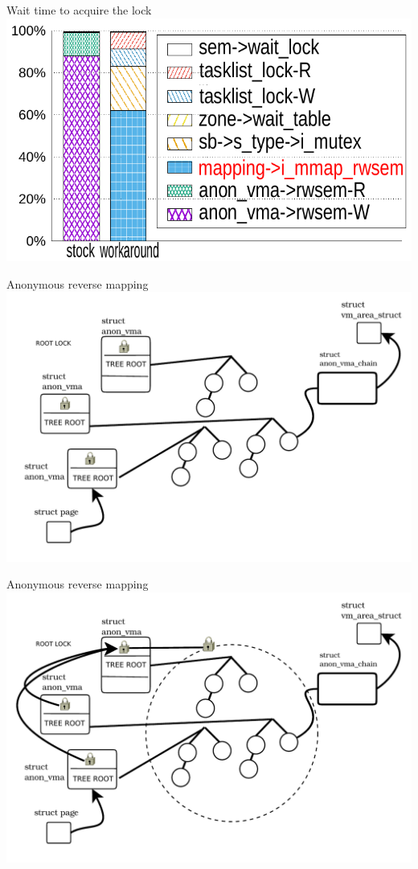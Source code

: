 \documentclass[english]{beamer} %
\begin{document}
\begin{frame}{Wait time to acquire the lock}
\includegraphics[scale=0.8]{fig/lockstat2}
\end{frame}

\begin{frame}{Anonymous reverse mapping}
\includegraphics[scale=0.5]{fig/anon_vma_default_0}
\end{frame}


\begin{frame}{Anonymous reverse mapping}
\includegraphics[scale=0.5]{fig/anon_vma_default}
\end{frame}
\end{document}
